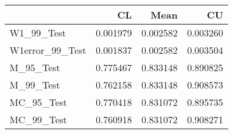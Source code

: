 \begin{tabular}{lrrr}
\toprule
{} &        CL &      Mean &        CU \\
\midrule
W1\_99\_Test      &  0.001979 &  0.002582 &  0.003260 \\
W1error\_99\_Test &  0.001837 &  0.002582 &  0.003504 \\
M\_95\_Test       &  0.775467 &  0.833148 &  0.890825 \\
M\_99\_Test       &  0.762158 &  0.833148 &  0.908573 \\
MC\_95\_Test      &  0.770418 &  0.831072 &  0.895735 \\
MC\_99\_Test      &  0.760918 &  0.831072 &  0.908271 \\
\bottomrule
\end{tabular}
